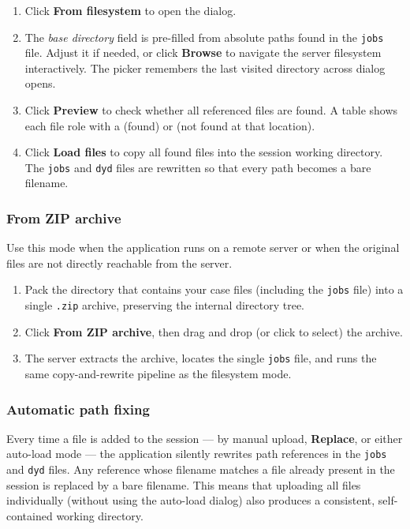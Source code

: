 \documentclass[a4paper,11pt]{article}
\newcommand{\code}[1]{\texttt{\small #1}}
\newcommand{\ftype}[1]{\texttt{\small\color{rteblu}#1}}
\begin{document}
\begin{enumerate}[leftmargin=2em]
  \item Click \textbf{From filesystem} to open the dialog.
  \item The \emph{base directory} field is pre-filled from absolute paths found
    in the \ftype{jobs} file. Adjust it if needed, or click \textbf{Browse}
    to navigate the server filesystem interactively. The picker remembers the
    last visited directory across dialog opens.
  \item Click \textbf{Preview} to check whether all referenced files are found.
    A table shows each file role with a \checkmark{} (found) or
    \texttimes{} (not found at that location).
  \item Click \textbf{Load files} to copy all found files into the session
    working directory. The \ftype{jobs} and \ftype{dyd} files are rewritten
    so that every path becomes a bare filename.
\end{enumerate}

\subsubsection{From ZIP archive}

Use this mode when the application runs on a remote server or when the original
files are not directly reachable from the server.

\begin{enumerate}[leftmargin=2em]
  \item Pack the directory that contains your case files (including the
    \ftype{jobs} file) into a single \code{.zip} archive, preserving the
    internal directory tree.
  \item Click \textbf{From ZIP archive}, then drag and drop (or click to
    select) the archive.
  \item The server extracts the archive, locates the single \ftype{jobs} file,
    and runs the same copy-and-rewrite pipeline as the filesystem mode.
\end{enumerate}

\subsubsection{Automatic path fixing}

Every time a file is added to the session --- by manual upload, \textbf{Replace},
or either auto-load mode --- the application silently rewrites path references
in the \ftype{jobs} and \ftype{dyd} files. Any reference whose filename matches
a file already present in the session is replaced by a bare filename. This means
that uploading all files individually (without using the auto-load dialog) also
produces a consistent, self-contained working directory.
\end{document}
